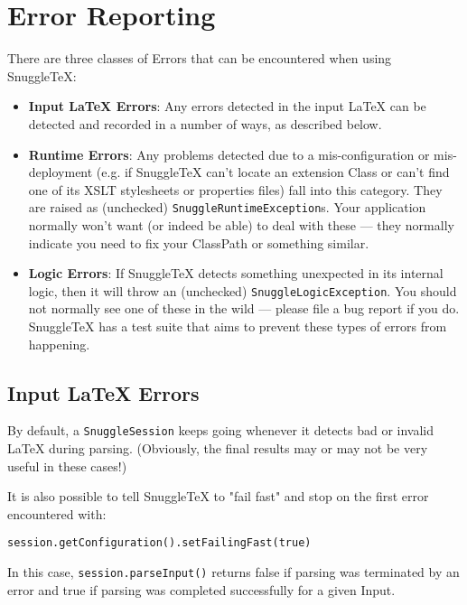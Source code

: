 
\section*{Error Reporting}

There are three classes of Errors that can be encountered when using SnuggleTeX:

\begin{itemize}

\item \textbf{Input LaTeX Errors}: Any errors detected in the input LaTeX can
  be detected and recorded in a number of ways, as described below.

\item \textbf{Runtime Errors}: Any problems detected due to a mis-configuration
  or mis-deployment (e.g. if SnuggleTeX can't locate an extension Class or can't
  find one of its XSLT stylesheets or properties files) fall into this category.
  They are raised as (unchecked) \verb|SnuggleRuntimeException|s. Your application
  normally won't want (or indeed be able) to deal with these --- they normally
  indicate you need to fix your ClassPath or something similar.

\item \textbf{Logic Errors}: If SnuggleTeX detects something unexpected in its
  internal logic, then it will throw an (unchecked) \verb|SnuggleLogicException|.
  You should not normally see one of these in the wild --- please file a bug report
  if you do. SnuggleTeX has a test suite that aims to prevent these types of errors
  from happening.
\end{itemize}

\subsection*{Input LaTeX Errors}

By default, a \verb|SnuggleSession| keeps going whenever it detects bad or
invalid LaTeX during parsing.
(Obviously, the final results may or may not be very useful in these cases!)

It is also possible to tell SnuggleTeX to "fail fast" and stop on the first error
encountered with:
\begin{verbatim}session.getConfiguration().setFailingFast(true)\end{verbatim}
In this case, \verb|session.parseInput()| returns false if parsing was
terminated by an error and true if parsing was completed successfully for
a given Input.

